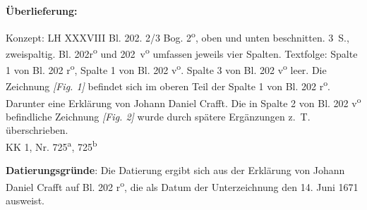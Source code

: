    
        
        \begin{ledgroupsized}[r]{120mm}
        \footnotesize 
        \pstart        
        \noindent\textbf{\"{U}berlieferung:}  
        \pend
        \end{ledgroupsized}
      
       
              \begin{ledgroupsized}[r]{114mm}
              \footnotesize 
              \pstart \parindent -6mm
              Konzept: LH XXXVIII Bl. 202. 2/3 Bog. 2\textsuperscript{o}, oben und unten beschnitten. 3~S., zweispaltig. Bl. 202r\textsuperscript{o} und 202~v\textsuperscript{o} umfassen jeweils vier Spalten. Textfolge: Spalte 1 von Bl. 202 r\textsuperscript{o}, Spalte 1 von Bl. 202 v\textsuperscript{o}. Spalte 3 von Bl. 202 v\textsuperscript{o} leer. Die Zeichnung \textit{[Fig. 1]} befindet sich im oberen Teil der Spalte 1 von Bl. 202 r\textsuperscript{o}. Darunter eine Erkl\"{a}rung von Johann Daniel Crafft. Die in Spalte 2 von Bl. 202 v\textsuperscript{o} befindliche Zeichnung \textit{[Fig. 2]} wurde durch sp\"{a}tere Erg\"{a}nzungen z.~T. \"{u}berschrieben.\\KK 1, Nr. 725\textsuperscript{a}, 725\textsuperscript{b} \pend
              \end{ledgroupsized}
        \vspace*{5mm}
        \begin{ledgroup}
        \footnotesize 
        \pstart
      \noindent\footnotesize{\textbf{Datierungsgr\"{u}nde}: Die Datierung ergibt sich aus der Erkl\"{a}rung von Johann Daniel Crafft auf Bl. 202 r\textsuperscript{o}, die als Datum der Unterzeichnung den 14. Juni 1671 ausweist.}
        \pend
        \end{ledgroup}
      
